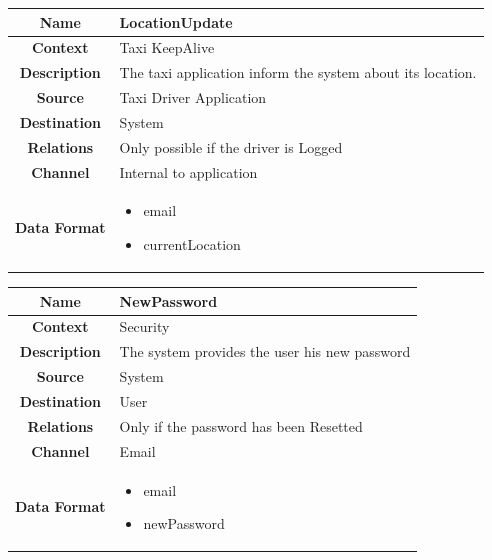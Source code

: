 \documentclass[11pt, a4paper,titlepage]{article}
\begin{document}
				\begin{tabularx}{\textwidth}{| c | X |}
					\hline
					\textbf{Name} & 
					LocationUpdate
					\\
					\hline
					\textbf{Context} & 
					Taxi KeepAlive
					\\
					\hline
					\textbf{Description} & 
					The taxi application inform the system about its location.
					\\
					\hline
					\textbf{Source} &
					Taxi Driver Application
					\\
					\hline
					\textbf{Destination} & 
					System
					\\
					\hline
					\textbf{Relations} & 
					Only possible if the driver is Logged
					\\
					\hline
					\textbf{Channel} & 
					Internal to application
					\\
					\hline
					\textbf{Data Format} & 
					\begin{itemize}
						\item email
						\item currentLocation
					\end{itemize}
					\\
					\hline		
				\end{tabularx}
				\begin{tabularx}{\textwidth}{| c | X |}
					\hline
					\textbf{Name} & 
					NewPassword
					\\
					\hline
					\textbf{Context} & 
					Security
					\\
					\hline
					\textbf{Description} & 
					The system provides the user his new password
					\\
					\hline
					\textbf{Source} &
					System
					\\
					\hline
					\textbf{Destination} & 
					User
					\\
					\hline
					\textbf{Relations} & 
					Only if the password has been Resetted
					\\
					\hline
					\textbf{Channel} & 
					Email
					\\
					\hline
					\textbf{Data Format} & 
					\begin{itemize}
						\item email
						\item newPassword
					\end{itemize}
					\\
					\hline		
				\end{tabularx}
\end{document}
